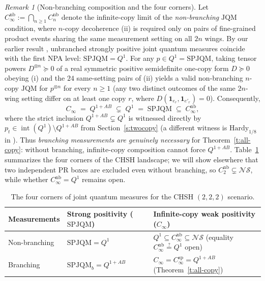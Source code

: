 \documentclass[11pt,a4paper]{article}
\theoremstyle{definition}
\theoremstyle{remark}
\newtheorem{remark}[theorem]{Remark}
\newcommand{\ind}[1]{\mathbf{1}_{#1}}
\newcommand{\JQM}{\mathrm{JQM}}
\newcommand{\SPJQMb}{\mathrm{SPJQM}_b}
\newcommand{\QAB}{Q^{1+AB}}
\newcommand{\NS}{\mathcal{NS}}
\begin{document}
\begin{remark}[Non-branching composition and the four corners]\label{r:four-corners}
Let $C_\infty^{\mathrm{nb}} := \bigcap_{n \ge 1} C_n^{\mathrm{nb}}$ denote the infinite-copy limit of the \emph{non-branching} $\JQM$ condition, where $n$-copy decoherence (ii) is required only on pairs of fine-grained product events sharing the same measurement setting on all $2n$ wings. By our earlier result \cite[Theorem~3.2]{SPJQM}, unbranched strongly positive joint quantum measures coincide with the first NPA level: $\mathrm{SPJQM} = Q^1$. For any $p \in Q^1 = \mathrm{SPJQM}$, taking tensor powers $D^{\otimes n} \succeq 0$ of a real symmetric positive semidefinite one-copy form $D \succeq 0$ obeying (i) and the $24$ same-setting pairs of (ii) yields a valid non-branching $n$-copy $\JQM$ for $p^{\otimes n}$ for every $n \ge 1$ (any two distinct outcomes of the same $2n$-wing setting differ on at least one copy $r$, where $D(\ind{e_r}, \ind{e'_r}) = 0$). Consequently,
\[
  C_\infty \;=\; \QAB \;\subsetneq\; Q^1 \;=\; \mathrm{SPJQM} \;\subseteq\; C_\infty^{\mathrm{nb}},
\]
where the strict inclusion $\QAB \subsetneq Q^1$ is witnessed directly by $p_t \in \operatorname{int}(Q^1) \setminus \QAB$ from Section~\ref{s:twocopy} (a different witness is $\mathrm{Hardy}_{1/8}$ in \cite[Corollary~6.3]{SPJQM}). Thus \emph{branching measurements are genuinely necessary} for Theorem~\ref{t:all-copy}: without branching, infinite-copy composition cannot force $\QAB$. Table~\ref{tab:corners} summarizes the four corners of the CHSH landscape; we will show elsewhere that two independent PR boxes are excluded even without branching, so $C_2^{\mathrm{nb}} \subsetneq \NS$, while whether $C_\infty^{\mathrm{nb}} = Q^1$ remains open.
\end{remark}

\begin{table}[h]
\centering
\caption{The four corners of joint quantum measures for the CHSH $(2,2,2)$ scenario.}\label{tab:corners}
\small
\begin{tabular}{@{}lll@{}}
\toprule
Measurements & Strong positivity ($\mathrm{SPJQM}$) & Infinite-copy weak positivity ($C_\infty$) \\
\midrule
Non-branching & $\mathrm{SPJQM} = Q^1$ \cite[Theorem~3.2]{SPJQM} & $Q^1 \subseteq C_\infty^{\mathrm{nb}} \subseteq \NS$ (equality $C_\infty^{\mathrm{nb}} \stackrel{?}{=} Q^1$ open) \\
Branching & $\SPJQMb = \QAB$ \cite[Theorem~21]{DHW} & $C_\infty = C_\infty^{\mathrm{sp}} = \QAB$ (Theorem~\ref{t:all-copy}) \\
\bottomrule
\end{tabular}
\end{table}
\end{document}
